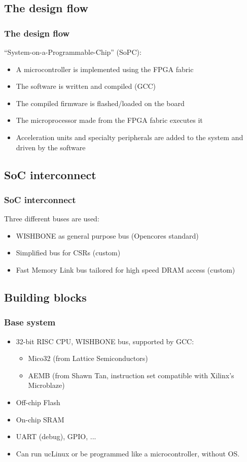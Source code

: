 \documentclass{beamer}
\begin{document}
\subsection{The design flow}
\frame
{
  \frametitle{The design flow}
  
  ``System-on-a-Programmable-Chip'' (SoPC):
  \begin{itemize}
  \item A microcontroller is implemented using the FPGA fabric
  \item The software is written and compiled (GCC)
  \item The compiled firmware is flashed/loaded on the board
  \item The microprocessor made from the FPGA fabric executes it
  \item Acceleration units and specialty peripherals are added to the system and driven by the software
  \end{itemize}
}

\subsection{SoC interconnect}
\frame
{
  \frametitle{SoC interconnect}
  
  Three different buses are used:
  \begin{itemize}
  \item WISHBONE as general purpose bus (Opencores standard)
  \item Simplified bus for CSRs (custom)
  \item Fast Memory Link bus tailored for high speed DRAM access (custom)
  \end{itemize}
}

\subsection{Building blocks}
\frame
{
  \frametitle{Base system}
  
  \begin{itemize}
  \item 32-bit RISC CPU, WISHBONE bus, supported by GCC:
  \begin{itemize}
  \item Mico32 (from Lattice Semiconductors)
  \item AEMB (from Shawn Tan, instruction set compatible with Xilinx's Microblaze)
  \end{itemize}
  \item Off-chip Flash
  \item On-chip SRAM
  \item UART (debug), GPIO, ...
  \item Can run ucLinux or be programmed like a microcontroller, without OS.
  \end{itemize}
}
\end{document}
